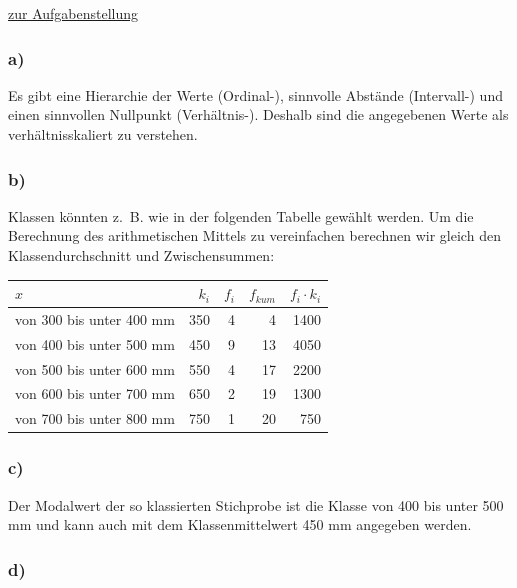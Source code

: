 \documentclass[
  11pt,
  ngerman,
  a4paper,
]{report}
\begin{document}
\protect\hyperlink{aufgabe-2-6}{zur Aufgabenstellung}

\hypertarget{a-7}{%
\subsubsection{a)}\label{a-7}}

Es gibt eine Hierarchie der Werte (Ordinal-), sinnvolle Abstände (Intervall-) und einen sinnvollen Nullpunkt (Verhältnis-). Deshalb sind die angegebenen Werte als verhältnisskaliert zu verstehen.

\hypertarget{b-7}{%
\subsubsection{b)}\label{b-7}}

Klassen könnten z.~B. wie in der folgenden Tabelle gewählt werden. Um die Berechnung des arithmetischen Mittels zu vereinfachen berechnen wir gleich den Klassendurchschnitt und Zwischensummen:

\begin{table}[H]
\centering
\begin{tabular}{lrrrr}
\toprule
\textbf{$x$} & \textbf{$k_i$} & \textbf{$f_i$} & \textbf{$f_{kum}$} & \textbf{$f_i \cdot k_i$}\\
\midrule
von 300 bis unter 400 mm & 350 & 4 & 4 & 1400\\
von 400 bis unter 500 mm & 450 & 9 & 13 & 4050\\
von 500 bis unter 600 mm & 550 & 4 & 17 & 2200\\
von 600 bis unter 700 mm & 650 & 2 & 19 & 1300\\
von 700 bis unter 800 mm & 750 & 1 & 20 & 750\\
\bottomrule
\end{tabular}
\end{table}

\hypertarget{c-6}{%
\subsubsection{c)}\label{c-6}}

Der Modalwert der so klassierten Stichprobe ist die Klasse von 400 bis unter 500 mm und kann auch mit dem Klassenmittelwert 450 mm angegeben werden.

\hypertarget{d-1}{%
\subsubsection{d)}\label{d-1}}
\end{document}
